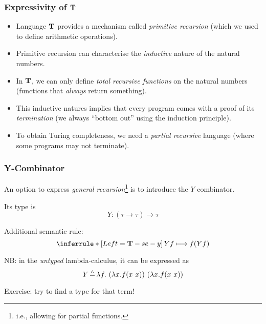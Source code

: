 \begin{frame}
  \frametitle{Expressivity of $\textbf{T}$}
  \begin{itemize}
  \item Language $\textbf{T}$ provides a mechanism called \emph{primitive
      recursion} (which we used to define arithmetic operations).
  \item Primitive recursion can characterise the \emph{inductive}
    nature of the natural numbers.
  \item In $\textbf{T}$, we can only define \emph{total recursive
      functions} on the natural numbers (functions that \emph{always} return
    something).
  \item This inductive natures implies that every program comes with a
    proof of its \emph{termination} (we always ``bottom out'' using the
    induction principle).
  \item To obtain Turing completeness, we need a \emph{partial
      recursive} language (where some programs may not terminate).
  \end{itemize}
\end{frame}





\begin{frame}
  \frametitle{Y-Combinator}
  An option to express \emph{general recursion}\footnote{i.e.,
    allowing for partial functions.} is to introduce the $Y$
  combinator.
  
  \bigskip
  Its type is
  \[
  Y : (\tau \rightarrow \tau) \rightarrow \tau
  \]
  

  \pause

  Additional semantic rule:
  \[
  \semrule
  {\tsemrulename{y}}
  {\,}
  {
    \jtrans{Y f}{ f(Y f)}
  }
  \]

  \pause
  \bigskip
 
  NB: in the \emph{untyped} lambda-calculus, it can be expressed as
  \[
  Y \defi \lambda f  .\ (\lambda x . f (x \ x))  \ (\lambda x . f (x \ x))
  \]

  Exercise: try to find a type for that term!
\end{frame}



